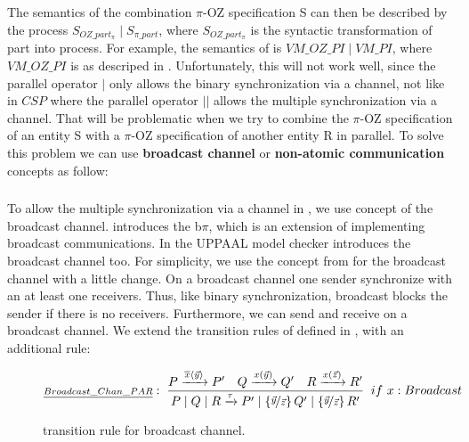 The semantics of the combination $\pi$-OZ specification S can then be described by the \picalc{} process $S_{OZ\_part_\pi} \mid S_{\pi\_part}$, where $S_{OZ\_part_\pi}$ is the syntactic transformation of \oz{} part into \picalc{} process. For example, the semantics of  is $VM\_OZ\_PI \mid VM\_PI$, where $VM\_OZ\_PI$ is as descriped in . Unfortunately, this will not work well, since the parallel operator $|$ only allows the binary synchronization via a channel, not like in $CSP$ where the parallel operator $||$ allows the multiple synchronization via a channel. That will be problematic when we try to combine the $\pi$-OZ specification of an entity S with a $\pi$-OZ specification of another entity R in parallel. To solve this problem we can use   \textbf{broadcast channel} or  \textbf{non-atomic communication} concepts as follow:

\subsubsection{}
To allow the multiple synchronization via a channel in \picalc{}, we use concept of the broadcast channel. \cite{ene} introduces the b$\pi$, which is an extension of \picalc{} implementing broadcast communications. In \cite{olderog08} the UPPAAL model checker introduces the broadcast channel too. For simplicity, we use the concept from \cite{olderog08} for the broadcast channel with a little change. On a broadcast channel one sender synchronize with an at least one receivers. Thus, like binary synchronization, broadcast blocks the sender if there is no receivers. Furthermore, we can send and receive on a broadcast channel. We extend the transition rules of \picalc{} defined in , with an additional rule:
\begin{figure}[H]
\begin{gather*}
\kalRuleM[if\ x: Broadcast]{Broadcast\_Chan\_PAR}{}{P \transs{\out{x}{\vec{y}}} P'}{Q \transs{\inp{x}{\vec{y}}} Q'}{R \transs{\inp{x}{\vec{z}}} R'}{\procpar{\procpar{P}{Q}}{R} \transs{\tau} 
\procpar{P'}{\procpar{\substitue{\vec{y}}{\vec{z}}Q'}{\substitue{\vec{y}}{\vec{z}}R'}}
}
\end{gather*}
\caption{transition rule for broadcast channel.}
\label{fig_broadcast_channel}
\end{figure}



